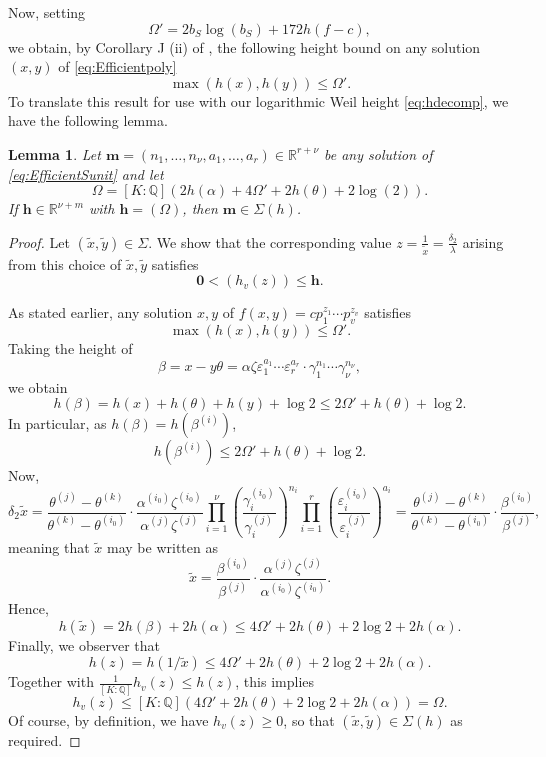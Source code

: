 \documentclass[11pt]{report}
\newtheorem{lemma}[theorem]{Lemma}
\theoremstyle{definition}
\begin{document}
Now, setting
\[\Omega' = 2b_S \log(b_S) + 172h(f-c),\]
we obtain, by Corollary J (ii) of \cite{KanMat}, the following height bound on any solution $(x,y)$ of \eqref{eq:Efficientpoly}
\[\max(h(x),h(y))\leq \Omega'.\]
To translate this result for use with our logarithmic Weil height \eqref{eq:hdecomp}, we have the following lemma.
\begin{lemma} \label{lem:TMinitialheight}
Let ${\mathbf{m} = (n_1, \dots, n_{\nu}, a_1, \dots, a_r) \in \mathbb{R}^{r + \nu}}$ be any solution of \eqref{eq:EfficientSunit} and let
\begin{equation} \label{eq:Omegaprime}
\Omega = [K:\mathbb{Q}](2h(\alpha) + 4\Omega' + 2h(\theta) + 2\log(2)).
\end{equation}
If $\mathbf{h} \in\mathbb{R}^{\nu + m}$ with $\mathbf{h} = (\Omega)$, then $\mathbf{m}\in \Sigma(h)$.
\end{lemma}

\begin{proof}
Let $(\tilde{x},\tilde{y}) \in \Sigma$. We show that the corresponding value $z = \frac{1}{\tilde{x}} = \frac{\delta_2}{\lambda}$ arising from this choice of $\tilde{x},\tilde{y}$ satisfies
\[\mathbf{0} < \left(h_v(z)\right)\leq \mathbf{h}.\]

As stated earlier, any solution $x,y$ of $f(x,y) = c p_1^{z_1}\cdots p_v^{z_v}$ satisfies
\[\max(h(x),h(y)) \leq \Omega'.\]
Taking the height of
\[\beta = x-y\theta = \alpha \zeta \varepsilon_1^{a_1} \cdots \varepsilon_r^{a_r}\cdot \gamma_1^{n_1}\cdots \gamma_{\nu}^{n_{\nu}},\]
we obtain
\[h(\beta) = h(x) + h(\theta) + h(y) + \log{2}  \leq 2\Omega' + h(\theta) + \log{2}.\]
In particular, as $h(\beta) = h(\beta^{(i)})$,
\[h(\beta^{(i)}) \leq 2\Omega' + h(\theta) + \log{2}.\]
Now,
\[\delta_2\tilde{x}
	= \frac{\theta^{(j)} - \theta^{(k)}}{\theta^{(k)} - \theta^{(i_0)}}\cdot \frac{\alpha^{(i_0)}\zeta^{(i_0)}}{\alpha^{(j)}\zeta^{(j)}} \prod_{i = 1}^{\nu} \left( \frac{\gamma_i^{(i_0)}}{\gamma_i^{(j)}}\right)^{n_i}\prod_{i = 1}^{r}\left( \frac{\varepsilon_i^{(i_0)}}{\varepsilon_i^{(j)}}\right)^{a_i}
	= \frac{\theta^{(j)} - \theta^{(k)}}{\theta^{(k)} - \theta^{(i_0)}}\cdot \frac{\beta^{(i_0)}}{\beta^{(j)}},\]
meaning that $\tilde{x}$ may be written as
\[\tilde{x} =\frac{\beta^{(i_0)}}{\beta^{(j)}}\cdot \frac{\alpha^{(j)}\zeta^{(j)}}{\alpha^{(i_0)}\zeta^{(i_0)}}.\]
Hence,
\[h(\tilde{x})	 = 2h(\beta) + 2h(\alpha) \leq 4\Omega' + 2h(\theta) + 2\log{2} + 2h(\alpha).\]
Finally, we observer that
\[h(z) = h(1/\tilde{x}) \leq 4\Omega' + 2h(\theta) + 2\log{2} + 2h(\alpha).\]
Together with $\displaystyle \frac{1}{[K:\mathbb{Q}]}h_v(z) \leq h(z)$, this implies
\[h_v(z) \leq [K:\mathbb{Q}](4\Omega' + 2h(\theta) + 2\log{2} + 2h(\alpha)) = \Omega.\]
Of course, by definition, we have $h_v(z) \geq 0$, so that $(\tilde{x},\tilde{y}) \in \Sigma(h)$ as required.
\end{proof}
\end{document}
